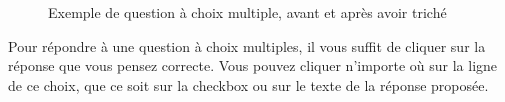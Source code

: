 \documentclass[11pt]{scrreprt}
\begin{document}
\begin{figure}[H]
{        }
        \caption{Exemple de question à choix multiple, avant et après avoir triché}
    \end{figure}

    Pour répondre à une question à choix multiples, il vous suffit de cliquer sur la réponse que vous pensez correcte. Vous pouvez cliquer n'importe où sur la ligne de ce choix, que ce soit sur la checkbox ou sur le texte de la réponse proposée.\\
\end{document}
